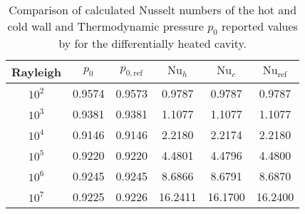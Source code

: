 \begin{table}[t!]
	\begin{center}
		\begin{tabular}{cccccc}
			\hline
			Rayleigh                           & $p_0$  & $p_{0,\text{ref}}$ & $\text{Nu}_{h}$ & $\text{Nu}_{c}$ & $\text{Nu}_{\text{ref}}$ \\ \hline
			\parbox[0pt][13pt][c]{0pt}{}$10^2$ & 0.9574 & 0.9573             & 0.9787          & 0.9787          & 0.9787                   \\
			$10^3$                             & 0.9381 & 0.9381             & 1.1077          & 1.1077          & 1.1077                   \\
			$10^4$                             & 0.9146 & 0.9146             & 2.2180          & 2.2174          & 2.2180                   \\
			$10^5$                             & 0.9220 & 0.9220             & 4.4801          & 4.4796          & 4.4800                   \\
			$10^6$                             & 0.9245 & 0.9245             & 8.6866          & 8.6791          & 8.6870                   \\
			$10^7$                             & 0.9225 & 0.9226             & 16.2411         & 16.1700         & 16.2400                  \\ \hline
		\end{tabular}
	\end{center}
	\caption[Differentially heated cavity: Results of Nusselt number and Thermodynamic pressure]{Comparison of calculated Nusselt numbers of the hot and cold wall and Thermodynamic pressure $p_0$ reported values by \textcite{vierendeelsBenchmarkSolutionsNatural2003} for the differentially heated cavity.}
	\label{tab:p0_Nu_Results}
\end{table}